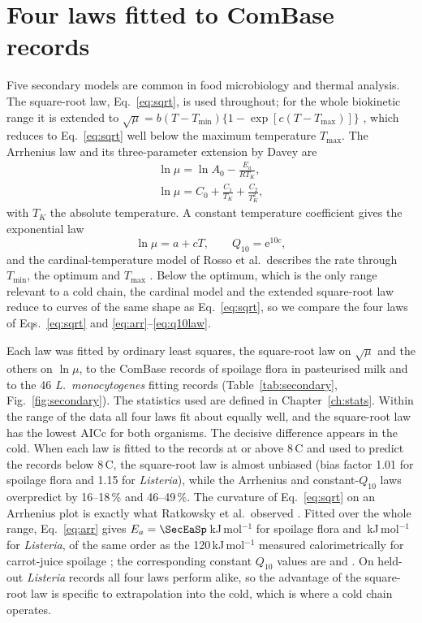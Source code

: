 \documentclass[11pt,a4paper,twoside,openany]{book}
\newcommand{\degC}{\,\textdegree C}
\theoremstyle{plain}\newtheorem{proposition}{Proposition}\newtheorem{corollary}{Corollary}
\theoremstyle{definition}\newtheorem{definition}{Definition}[chapter]
\begin{document}
\section{Four laws fitted to ComBase records}
Five secondary models are common in food microbiology and thermal analysis. The square-root law, Eq.~\eqref{eq:sqrt}, is used throughout; for the whole biokinetic range it is extended to $\sqrt{\mu}=b(T-T_{\min})\{1-\exp[c(T-T_{\max})]\}$ \cite{ratkowsky1982}, which reduces to Eq.~\eqref{eq:sqrt} well below the maximum temperature $T_{\max}$. The Arrhenius law and its three-parameter extension by Davey are
\begin{gather}
\ln\mu=\ln A_0-\frac{E_a}{RT_K},\label{eq:arr}\\
\ln\mu=C_0+\frac{C_1}{T_K}+\frac{C_2}{T_K^2},\label{eq:davey}
\end{gather}
with $T_K$ the absolute temperature. A constant temperature coefficient gives the exponential law
\begin{equation}\label{eq:q10law}
\ln\mu=a+cT,\qquad Q_{10}=\mathrm{e}^{10c},
\end{equation}
and the cardinal-temperature model of Rosso et al.\ describes the rate through $T_{\min}$, the optimum and $T_{\max}$ \cite{rosso1993}. Below the optimum, which is the only range relevant to a cold chain, the cardinal model and the extended square-root law reduce to curves of the same shape as Eq.~\eqref{eq:sqrt}, so we compare the four laws of Eqs.~\eqref{eq:sqrt} and \eqref{eq:arr}--\eqref{eq:q10law}.

Each law was fitted by ordinary least squares, the square-root law on $\sqrt{\mu}$ and the others on $\ln\mu$, to the \NumCbN{} ComBase records of spoilage flora in pasteurised milk and to the 46 \textit{L.~monocytogenes} fitting records (Table~\ref{tab:secondary}, Fig.~\ref{fig:secondary}). The statistics used are defined in Chapter~\ref{ch:stats}. Within the range of the data all four laws fit about equally well, and the square-root law has the lowest AICc for both organisms. The decisive difference appears in the cold. When each law is fitted to the records at or above 8\degC{} and used to predict the records below 8\degC, the square-root law is almost unbiased (bias factor 1.01 for spoilage flora and 1.15 for \textit{Listeria}), while the Arrhenius and constant-$Q_{10}$ laws overpredict by 16--18\,\% and 46--49\,\%. The curvature of Eq.~\eqref{eq:sqrt} on an Arrhenius plot is exactly what Ratkowsky et al.\ observed \cite{ratkowsky1982}. Fitted over the whole range, Eq.~\eqref{eq:arr} gives $E_a=\SecEaSp$\,kJ\,mol$^{-1}$ for spoilage flora and \SecEaLis\,kJ\,mol$^{-1}$ for \textit{Listeria}, of the same order as the 120\,kJ\,mol$^{-1}$ measured calorimetrically for carrot-juice spoilage \cite{wadso2011}; the corresponding constant $Q_{10}$ values are \SecQtenSp{} and \SecQtenLis. On held-out \textit{Listeria} records all four laws perform alike, so the advantage of the square-root law is specific to extrapolation into the cold, which is where a cold chain operates.
\end{document}
